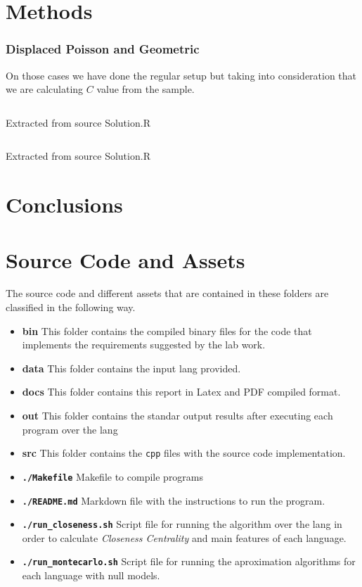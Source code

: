 \documentclass[12pt, a4paper]{article}
\begin{document}
\section{Methods}

\subsubsection{Displaced Poisson and Geometric}
On those cases we have done the regular setup but taking into consideration that we are calculating $C$ value from the sample.
\begin{listing}[H]
    \inputminted[firstline=11, lastline=19, breaklines]{R}{./Solution.R}
    \caption{Extracted from source Solution.R}
    \label{apx:src:4}
\end{listing}  
\begin{listing}[H]
    \inputminted[firstline=86, lastline=95, breaklines]{R}{./Solution.R}
    \caption{Extracted from source Solution.R}
    \label{apx:src:5}
\end{listing}  


\section{Conclusions}

\printglossary[type=\acronymtype]

\appendix\label{apx:org}
\section{Source Code and Assets}
The source code and different assets that are contained in these folders are classified in the following way.

\begin{itemize}
    \item \textbf{bin} This folder contains the compiled binary files for the code that implements the requirements suggested by the lab work.
    \item \textbf{data} This folder contains the input \acrshort{lang} provided.
    \item \textbf{docs} This folder contains this report in Latex and PDF compiled format.
    \item \textbf{out} This folder contains the standar output results after executing each program over the \acrshort{lang}
    \item \textbf{src} This folder contains the \texttt{cpp} files with the source code implementation.
    \item \textbf{\texttt{./Makefile}} Makefile to compile programs
    \item \textbf{\texttt{./README.md}} Markdown file with the instructions to run the program.
    \item \textbf{\texttt{./run_closeness.sh}} Script file for running the algorithm over the \acrshort{lang} in order to calculate \textit{Closeness Centrality} and 
    main features of each language.
    \item \textbf{\texttt{./run_montecarlo.sh}} Script file for running the aproximation algorithms for each language with null models.
\end{itemize}
\end{document}
